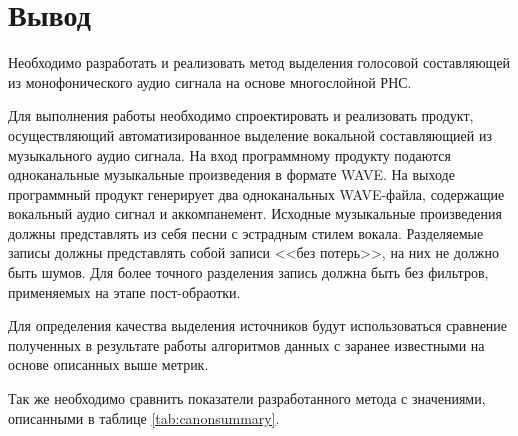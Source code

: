 \section{Вывод}

Необходимо разработать и реализовать метод выделения голосовой составляющей из монофонического аудио сигнала на основе многослойной РНС.

Для выполнения работы необходимо спроектировать и реализовать продукт, осуществляющий автоматизированное выделение вокальной составляющией из музыкального аудио сигнала. На вход программному продукту подаются одноканальные музыкальные произведения в формате WAVE. На выходе программный продукт генерирует два одноканальных WAVE-файла, содержащие вокальный аудио сигнал и аккомпанемент. Исходные музыкальные произведения должны представлять из себя песни с эстрадным стилем вокала. Разделяемые записы должны представлять собой записи <<без потерь>>, на них не должно быть шумов. Для более точного разделения запись должна быть без фильтров, применяемых на этапе пост-обраотки.

Для определения качества выделения источников будут использоваться сравнение полученных в результате работы алгоритмов данных с заранее известными на основе описанных выше метрик.

Так же необходимо сравнить показатели разработанного метода с значениями, описанными в таблице \ref{tab:canonsummary}.

